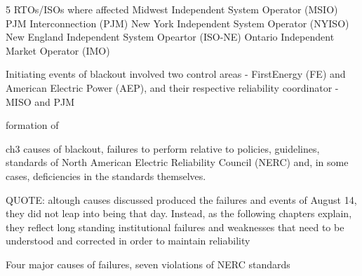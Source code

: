 5 RTOs/ISOs where affected
Midwest Independent System Operator (MSIO)
PJM Interconnection (PJM)
New York Independent System Operator (NYISO)
New England Independent System Opeartor (ISO-NE)
Ontario Independent Market Operator (IMO)

Initiating events of blackout involved two control areas
 - FirstEnergy (FE) and American Electric Power (AEP),
 and their respective reliability coordinator
- MISO and PJM


formation of



ch3 causes of blackout, failures to perform relative to policies, guidelines, standards of North American Electric Reliability Council (NERC) and, in some cases, deficiencies in the standards themselves.

QUOTE:  altough causes discussed produced the failures and events of August 14, they did not leap into being that day. Instead, as the following chapters explain, they reflect long standing institutional failures and weaknesses that need to be understood and corrected in order to maintain reliability

Four major causes of failures, seven violations of NERC standards

